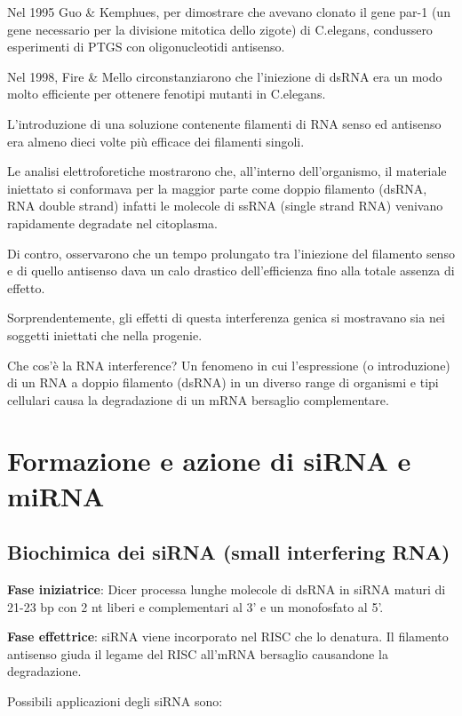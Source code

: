 \documentclass[]{article}
\begin{document}
Nel 1995 Guo \& Kemphues, per dimostrare che avevano clonato il gene
par-1 (un gene necessario per la divisione mitotica dello zigote) di
C.elegans, condussero esperimenti di PTGS con oligonucleotidi antisenso.

Nel 1998, Fire \& Mello circonstanziarono che l'iniezione di dsRNA era
un modo molto efficiente per ottenere fenotipi mutanti in C.elegans.

L'introduzione di una soluzione contenente filamenti di RNA senso ed
antisenso era almeno dieci volte più efficace dei filamenti singoli.

Le analisi elettroforetiche mostrarono che, all'interno dell'organismo,
il materiale iniettato si conformava per la maggior parte come doppio
filamento (dsRNA, RNA double strand) infatti le molecole di ssRNA
(single strand RNA) venivano rapidamente degradate nel citoplasma.

Di contro, osservarono che un tempo prolungato tra l'iniezione del
filamento senso e di quello antisenso dava un calo drastico
dell'efficienza fino alla totale assenza di effetto.

Sorprendentemente, gli effetti di questa interferenza genica si
mostravano sia nei soggetti iniettati che nella progenie.

Che cos'è la RNA interference? Un fenomeno in cui l'espressione (o
introduzione) di un RNA a doppio filamento (dsRNA) in un diverso range
di organismi e tipi cellulari causa la degradazione di un mRNA bersaglio
complementare.

\section{Formazione e azione di siRNA e
miRNA}\label{formazione-e-azione-di-sirna-e-mirna}

\subsection{Biochimica dei siRNA (small interfering
RNA)}\label{biochimica-dei-sirna-small-interfering-rna}

\textbf{Fase iniziatrice}: Dicer processa lunghe molecole di dsRNA in
siRNA maturi di 21-23 bp con 2 nt liberi e complementari al 3' e un
monofosfato al 5'.

\textbf{Fase effettrice}: siRNA viene incorporato nel RISC che lo
denatura. Il filamento antisenso giuda il legame del RISC all'mRNA
bersaglio causandone la degradazione.

Possibili applicazioni degli siRNA sono:
\end{document}
